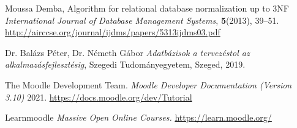 %
%


\begin{thebibliography}{9}





Moussa Demba,
Algorithm for relational database normalization up to 3NF
\emph{International Journal of Database Management Systems}, \textbf{5}(2013), 39--51.
\href{http://airccse.org/journal/ijdms/papers/5313ijdms03.pdf}{http://airccse.org/journal/ijdms/papers/5313ijdms03.pdf}

Dr. Balázs Péter, Dr. Németh Gábor
\emph{Adatbázisok a tervezéstol az alkalmazásfejlesztésig},
Szegedi Tudományegyetem, Szeged, 2019.

The Moodle Development Team.
\emph{Moodle Developer Documentation (Version 3.10)} 2021. \href{https://docs.moodle.org/dev/Tutorial}{https://docs.moodle.org/dev/Tutorial}

Learnmoodle
\emph{Massive Open Online Courses.} 
\href{https://learn.moodle.org/}{https://learn.moodle.org/}
\end{thebibliography}
